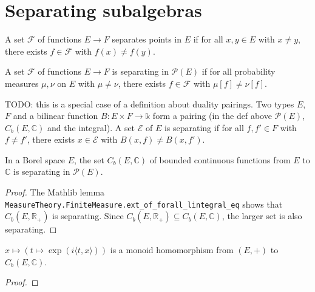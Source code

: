\chapter{Separating subalgebras}

\begin{definition}\label{def:separates_points}
 \leanok
A set $\mathcal F$ of functions $E \to F$ separates points in $E$ if for all $x, y \in E$ with $x \ne y$, there exists $f \in \mathcal F$ with $f(x) \ne f(y)$.
\end{definition}

\begin{definition}\label{def:separating}
A set $\mathcal F$ of functions $E \to F$ is separating in $\mathcal P(E)$ if for all probability measures $\mu, \nu$ on $E$ with $\mu \ne \nu$, there exists $f \in \mathcal F$ with $\mu[f] \ne \nu[f]$.
\end{definition}

TODO: this is a special case of a definition about duality pairings. Two types $E$, $F$ and a bilinear function $B : E \times F \to \mathbb{k}$ form a pairing (in the def above $\mathcal P(E)$, $C_b(E, \mathbb{C})$ and the integral). A set $\mathcal E$ of $E$ is separating if for all $f, f' \in F$ with $f \ne f'$, there exists $x \in \mathcal E$ with $B(x, f) \ne B(x, f')$. 

\begin{lemma}\label{lem:bounded_continuous_separating}
In a Borel space $E$, the set $C_b(E, \mathbb{C})$ of bounded continuous functions from $E$ to $\mathbb{C}$ is separating in $\mathcal P(E)$.
\end{lemma}

\begin{proof}
The Mathlib lemma \texttt{MeasureTheory.FiniteMeasure.ext\_of\_forall\_lintegral\_eq} shows that $C_b(E, \mathbb{R}_+)$ is separating. Since $C_b(E, \mathbb{R}_{+}) \subseteq C_b(E, \mathbb{C})$, the larger set is also separating.
\end{proof}

\begin{lemma}\label{lem:exp_character}
 \leanok
$x \mapsto (t \mapsto \exp(i \langle t, x \rangle))$ is a monoid homomorphism from $(E,+)$ to $C_b(E, \mathbb{C})$.
\end{lemma}

\begin{proof}\leanok
\end{proof}

